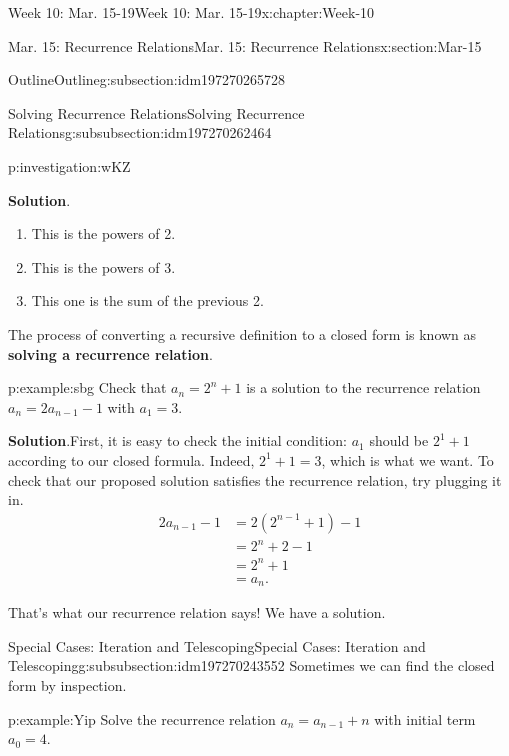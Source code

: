 \documentclass[oneside,10pt,]{book}
\newcommand{\blocktitlefont}{\relax}
\newcommand{\terminology}[1]{\textbf{#1}}
\numberwithin{equation}{section}
\newcommand{\amp}{&}
\begin{document}
\begin{chapterptx}{Week 10: Mar. 15-19}{}{Week 10: Mar. 15-19}{}{}{x:chapter:Week-10}
\begin{sectionptx}{Mar. 15: Recurrence Relations}{}{Mar. 15: Recurrence Relations}{}{}{x:section:Mar-15}
\begin{subsectionptx}{Outline}{}{Outline}{}{}{g:subsection:idm197270265728}
\begin{subsubsectionptx}{Solving Recurrence Relations}{}{Solving Recurrence Relations}{}{}{g:subsubsection:idm197270262464}
\begin{investigation}{}{p:investigation:wKZ}
\begin{enumerate}
\end{enumerate}
%
\par\smallskip%
\noindent\textbf{\blocktitlefont Solution}.\hypertarget{g:solution:idm197270253008}{}\quad{}%
\begin{enumerate}
\item{}This is the powers of 2.%
\item{}This is the powers of 3.%
\item{}This one is the sum of the previous 2.%
\end{enumerate}
\end{investigation}%
The process of converting a recursive definition to a closed form is known as \terminology{solving a recurrence relation}.%
\begin{example}{}{p:example:sbg}%
Check that \(a_n = 2^n + 1\) is a solution to the recurrence relation \(a_n = 2a_{n-1} - 1\) with \(a_1 = 3\).%
\par\smallskip%
\noindent\textbf{\blocktitlefont Solution}.\hypertarget{p:solution:IZr}{}\quad{}First, it is easy to check the initial condition: \(a_1\) should be \(2^1 + 1\) according to our closed formula. Indeed, \(2^1 + 1 = 3\), which is what we want. To check that our proposed solution satisfies the recurrence relation, try plugging it in.%
\begin{align*}
2a_{n-1} - 1 \amp = 2(2^{n-1} + 1) - 1\\
\amp = 2^n + 2 - 1\\
\amp = 2^n +1\\
\amp = a_n\text{.}
\end{align*}
%
\par
That's what our recurrence relation says! We have a solution.%
\end{example}
\end{subsubsectionptx}
%
%
\typeout{************************************************}
\typeout{************************************************}
%
\begin{subsubsectionptx}{Special Cases: Iteration and Telescoping}{}{Special Cases: Iteration and Telescoping}{}{}{g:subsubsection:idm197270243552}
Sometimes we can find the closed form by inspection.%
\begin{example}{}{p:example:Yip}%
Solve the recurrence relation \(a_n = a_{n-1} + n\) with initial term \(a_0 = 4\).%
\par\smallskip%

\end{example}
\end{subsubsectionptx}
\end{subsectionptx}
\end{sectionptx}
\end{chapterptx}
\end{document}

